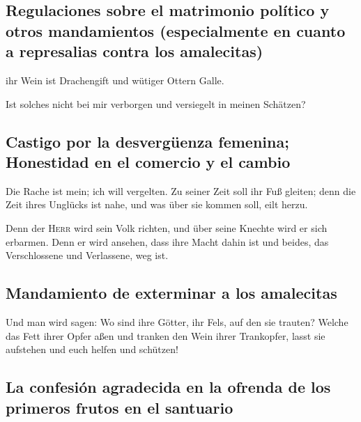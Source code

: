 \hypertarget{regulaciones-sobre-el-matrimonio-poluxedtico-y-otros-mandamientos-especialmente-en-cuanto-a-represalias-contra-los-amalecitas}{%
\subsection{Regulaciones sobre el matrimonio político y otros
mandamientos (especialmente en cuanto a represalias contra los
amalecitas)}\label{regulaciones-sobre-el-matrimonio-poluxedtico-y-otros-mandamientos-especialmente-en-cuanto-a-represalias-contra-los-amalecitas}}

 ihr Wein ist Drachengift und wütiger Ottern Galle.

 Ist solches nicht bei mir verborgen und versiegelt in
meinen Schätzen?

\hypertarget{castigo-por-la-desverguxfcenza-femenina-honestidad-en-el-comercio-y-el-cambio}{%
\subsection{Castigo por la desvergüenza femenina; Honestidad en el
comercio y el
cambio}\label{castigo-por-la-desverguxfcenza-femenina-honestidad-en-el-comercio-y-el-cambio}}

 Die Rache ist mein; ich will vergelten. Zu seiner Zeit
soll ihr Fuß gleiten; denn die Zeit ihres Unglücks ist nahe, und was
über sie kommen soll, eilt herzu.

 Denn der \textsc{Herr} wird sein Volk richten, und über
seine Knechte wird er sich erbarmen. Denn er wird ansehen, dass ihre
Macht dahin ist und beides, das Verschlossene und Verlassene, weg ist.

\hypertarget{mandamiento-de-exterminar-a-los-amalecitas}{%
\subsection{Mandamiento de exterminar a los
amalecitas}\label{mandamiento-de-exterminar-a-los-amalecitas}}

 Und man wird sagen: Wo sind ihre Götter, ihr Fels, auf
den sie trauten?  Welche das Fett ihrer Opfer aßen und
tranken den Wein ihrer Trankopfer, lasst sie aufstehen und euch helfen
und schützen!

\hypertarget{la-confesiuxf3n-agradecida-en-la-ofrenda-de-los-primeros-frutos-en-el-santuario}{%
\subsection{La confesión agradecida en la ofrenda de los primeros frutos
en el
santuario}\label{la-confesiuxf3n-agradecida-en-la-ofrenda-de-los-primeros-frutos-en-el-santuario}}

